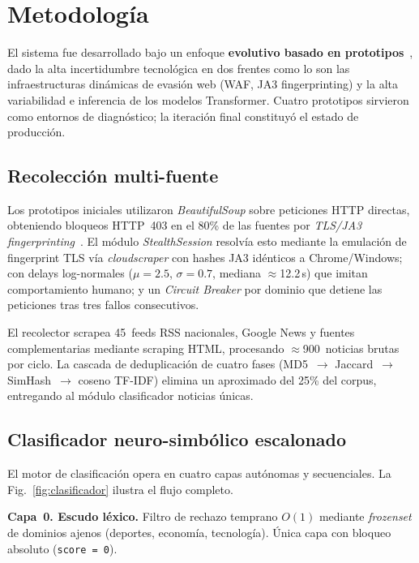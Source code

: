 \documentclass[conference]{IEEEtran}
\begin{document}
\section{Metodología}

El sistema fue desarrollado bajo un enfoque \textbf{evolutivo basado en
prototipos}~\cite{pressman2014}, dado la alta incertidumbre tecnológica en
dos frentes como lo son las infraestructuras dinámicas de evasión web
(WAF, JA3 fingerprinting) y la alta variabilidad e inferencia de los
modelos Transformer. Cuatro prototipos sirvieron como entornos de diagnóstico;
la iteración final constituyó el estado de producción.

\subsection{Recolección multi-fuente}

Los prototipos iniciales utilizaron \textit{BeautifulSoup} sobre
peticiones HTTP directas, obteniendo bloqueos HTTP~403 en el 80\% de las
fuentes por \textit{TLS/JA3 fingerprinting}~\cite{anderson2019tls}.
El módulo \textit{StealthSession} resolvía esto mediante
la emulación de fingerprint TLS vía \textit{cloudscraper} con hashes JA3
idénticos a Chrome/Windows; con delays log-normales ($\mu{=}2.5$,
$\sigma{=}0.7$, mediana $\approx$12.2\,s) que imitan comportamiento humano;
y un \textit{Circuit Breaker} por dominio que detiene las peticiones tras
tres fallos consecutivos.

El recolector scrapea 45~feeds RSS nacionales, Google News y fuentes
complementarias mediante scraping HTML, procesando $\approx$900~noticias brutas
por ciclo. La cascada de deduplicación de cuatro fases
(MD5~$\rightarrow$ Jaccard~$\rightarrow$ SimHash~$\rightarrow$ coseno TF-IDF) elimina un aproximado del 25\% del
corpus, entregando al módulo clasificador noticias únicas.

\subsection{Clasificador neuro-simbólico escalonado}

El motor de clasificación opera en cuatro capas autónomas y secuenciales.
La Fig.~\ref{fig:clasificador} ilustra el flujo completo.

\textbf{Capa~0. Escudo léxico.} Filtro de rechazo temprano $O(1)$
mediante \textit{frozenset} de dominios ajenos (deportes, economía,
tecnología). Única capa con bloqueo absoluto (\texttt{score~=~0}).
\end{document}
